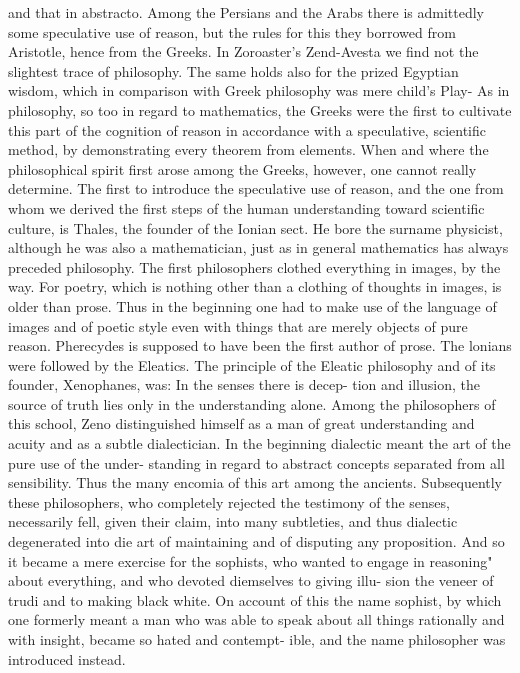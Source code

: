 and that in abstracto. Among the Persians and the Arabs there is admittedly
some speculative use of reason, but the rules for this they borrowed from
Aristotle, hence from the Greeks. In Zoroaster's Zend-Avesta we find not the
slightest trace of philosophy. The same holds also for the prized Egyptian
wisdom, which in comparison with Greek philosophy was mere child's
Play-
As in philosophy, so too in regard to mathematics, the Greeks were the
first to cultivate this part of the cognition of reason in accordance with a
speculative, scientific method, by demonstrating every theorem from
elements.
When and where the philosophical spirit first arose among the Greeks,
however, one cannot really determine.
The first to introduce the speculative use of reason, and the one from
whom we derived the first steps of the human understanding toward
scientific culture, is Thales, the founder of the Ionian sect. He bore the
surname physicist, although he was also a mathematician, just as in general
mathematics has always preceded philosophy.
The first philosophers clothed everything in images, by the way. For
poetry, which is nothing other than a clothing of thoughts in images, is
older than prose. Thus in the beginning one had to make use of the
language of images and of poetic style even with things that are merely
objects of pure reason. Pherecydes is supposed to have been the first author
of prose.
The lonians were followed by the Eleatics. The principle of the Eleatic
philosophy and of its founder, Xenophanes, was: In the senses there is decep-
tion and illusion, the source of truth lies only in the understanding alone.
Among the philosophers of this school, Zeno distinguished himself as a
man of great understanding and acuity and as a subtle dialectician.
In the beginning dialectic meant the art of the pure use of the under-
standing in regard to abstract concepts separated from all sensibility.
Thus the many encomia of this art among the ancients. Subsequently
these philosophers, who completely rejected the testimony of the senses,
necessarily fell, given their claim, into many subtleties, and thus dialectic
degenerated into die art of maintaining and of disputing any proposition.
And so it became a mere exercise for the sophists, who wanted to engage in
reasoning" about everything, and who devoted diemselves to giving illu-
sion the veneer of trudi and to making black white. On account of this the
name sophist, by which one formerly meant a man who was able to speak
about all things rationally and with insight, became so hated and contempt-
ible, and the name philosopher was introduced instead.
